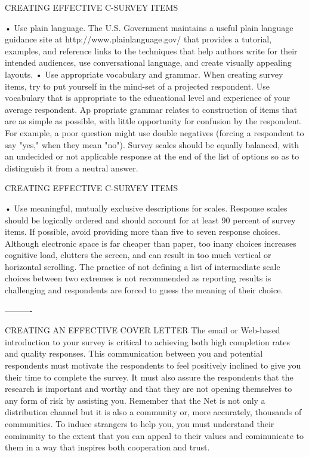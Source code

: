 \documentclass{beamer}
\begin{document}
\begin{frame}{CREATING EFFECTIVE C-SURVEY ITEMS}
 
• Use plain language. The U.S. Government maintains a useful plain language guidance site at http://www.plainlanguage.gov/ that provides a tutorial, examples, and reference links to the techniques that help authors write for their intended audiences, use conversational language, and create visually appealing layouts. 
• Use appropriate vocabulary and grammar. When creating survey items, try to put yourself in the mind-set of a projected respondent. Use vocabulary that is appropriate to the educational level and experience of your average respondent. Ap propriate grammar relates to construction of items that are as simple as possible, with little opportunity for confusion by the respondent. For example, a poor question might use double negatives (forcing a respondent to say "yes," when they mean "no"). Survey scales should be equally balanced, with an undecided or not applicable response at the end of the list of options so as to distinguish it from a neutral answer. 
\end{frame}


\begin{frame}{CREATING EFFECTIVE C-SURVEY ITEMS}

• Use meaningful, mutually exclusive descriptions for scales. Response scales should be logically ordered and should account for at least 90 percent of survey items. If possible, avoid providing more than five to seven response choices. Although electronic space is far cheaper than paper, too inany choices increases cognitive load, clutters the screen, and can result in too much vertical or horizontal scrolling. The practice of not defining a list of intermediate scale choices between two extremes is not recommended as reporting results is challenging and respondents are forced to guess the meaning of their choice.  
\end{frame}


----------
\begin{frame}{CREATING AN EFFECTIVE COVER LETTER}
The email or Web-based introduction to your survey is critical to achieving both high completion rates and quality responses. This communication between you and potential respondents must motivate 
the respondents to feel positively inclined to give you their time to complete the survey. It must also assure the respondents that the research is important and worthy and that they are not opening themselves to any form of risk by assisting you. 
Remember that the Net is not only a distribution channel but it is also a community or, more accurately, thousands of communities. To induce strangers to help you, you must understand their cominunity to the extent that you can appeal to their values and cominunicate to them in a way that inspires both cooperation and trust. 

\end{frame}
\end{document}
